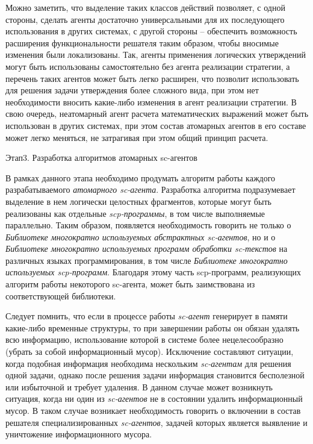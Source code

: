 \begin{SCn}
{\begin{scnitemize}
Можно заметить, что выделение таких классов действий позволяет, с одной стороны, сделать агенты достаточно универсальными для их последующего использования в других системах, с другой стороны -- обеспечить возможность расширения функциональности решателя таким образом, чтобы вносимые изменения были локализованы. Так, агенты применения логических утверждений могут быть использованы самостоятельно без агента реализации стратегии, а перечень таких агентов может быть легко расширен, что позволит использовать для решения задачи утверждения более сложного вида, при этом нет необходимости вносить какие-либо изменения в агент реализации стратегии. В свою очередь, неатомарный агент расчета математических выражений может быть использован в других системах, при этом состав атомарных агентов в его составе может легко меняться, не затрагивая при этом общий принцип расчета.

\item Этап3. Разработка алгоритмов атомарных sc-агентов

В рамках данного этапа необходимо продумать алгоритм работы каждого разрабатываемого \textit{атомарного sc-агента}. Разработка алгоритма подразумевает выделение в нем логически целостных фрагментов, которые могут быть реализованы как отдельные \textit{scp-программы}, в том числе выполняемые параллельно. Таким образом, появляется необходимость говорить не только о \textit{Библиотеке многократно используемых абстрактных sc-агентов}, но и о \textit{Библиотеке многократно используемых программ обработки sc-текстов} на различных языках программирования, в том числе \textit{Библиотеке многократно используемых scp-программ}. Благодаря этому часть scp-программ, реализующих алгоритм работы некоторого sc-агента, может быть заимствована из соответствующей библиотеки.

Следует помнить, что если в процессе работы \textit{sc-агент} генерирует в памяти какие-либо временные структуры, то при завершении работы он обязан удалять всю информацию, использование которой в системе более нецелесообразно (убрать за собой информационный мусор). Исключение составляют ситуации, когда подобная информация необходима нескольким \textit{sc-агентам} для решения одной задачи, однако после решения задачи информация становится бесполезной или избыточной и требует удаления. В данном случае может возникнуть ситуация, когда ни один из \textit{sc-агентов} не в состоянии удалить информационный мусор. В таком случае возникает необходимость говорить о включении в состав решателя специализированных \textit{sc-агентов}, задачей которых является выявление и уничтожение информационного мусора.


\end{scnitemize}}
\end{SCn}
